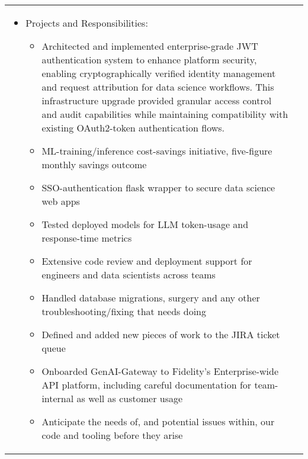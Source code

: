 \documentclass[a4paper,12pt]{article}
\begin{document}
\begin{tabularx}{\linewidth}{ @{}l r@{} }
{\begin{minipage}[t]{\linewidth}
\begin{itemize}[nosep,after=\strut, leftmargin=1em, itemsep=3pt]
    \item Projects and Responsibilities:
    	\begin{itemize}
			\item Architected and implemented enterprise-grade JWT authentication system to enhance
				platform security, enabling cryptographically verified identity management and
				request attribution for data science workflows. This infrastructure upgrade provided
				granular access control and audit capabilities while maintaining compatibility with
				existing OAuth2-token authentication flows.
			\item ML-training/inference cost-savings initiative, five-figure monthly savings outcome
			\item SSO-authentication flask wrapper to secure data science web apps
    		\item Tested deployed models for LLM token-usage and response-time metrics
			\item Extensive code review and deployment support for engineers and data scientists across teams
			\item Handled database migrations, surgery and any other troubleshooting/fixing that needs doing
			\item Defined and added new pieces of work to the JIRA ticket queue
			\item Onboarded GenAI-Gateway to Fidelity's Enterprise-wide API platform, including careful documentation for team-internal as well as customer usage
			\item Anticipate the needs of, and potential issues within, our code and tooling before they arise
		\end{itemize}
    \end{itemize}
    \end{minipage}
}
\end{tabularx}
\end{document}
